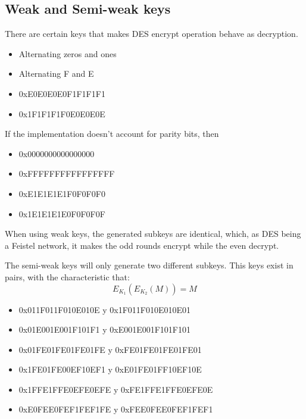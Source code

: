 \documentclass[titlepage, 12pt]{article}
\numberwithin{equation}{section}%
\numberwithin{figure}{section}%
\numberwithin{table}{section}%
\begin{document}
		\subsection{Weak and Semi-weak keys}
		There are certain keys that makes DES encrypt operation behave as decryption.
		\begin{itemize}
			\item Alternating zeros and ones
			\item Alternating F and E
			\item 0xE0E0E0E0F1F1F1F1
			\item 0x1F1F1F1F0E0E0E0E
		\end{itemize}
		If the implementation doesn't account for parity bits, then
		\begin{itemize}
			\item 0x0000000000000000
			\item 0xFFFFFFFFFFFFFFFF
			\item 0xE1E1E1E1F0F0F0F0
			\item 0x1E1E1E1E0F0F0F0F
		\end{itemize}
		When using weak keys, the generated subkeys are identical, which, as DES being a Feistel network, it makes the odd rounds encrypt while the even decrypt.
		
		The semi-weak keys will only generate two different subkeys. This keys exist in pairs, with the characteristic that:
		\begin{equation*}
		E_{K_1}(E_{K_2}(M))=M
		\end{equation*}
		\begin{itemize}
			\item 0x011F011F010E010E y 0x1F011F010E010E01
			\item 0x01E001E001F101F1 y 0xE001E001F101F101
			\item 0x01FE01FE01FE01FE y 0xFE01FE01FE01FE01
			\item 0x1FE01FE00EF10EF1 y 0xE01FE01FF10EF10E
			\item 0x1FFE1FFE0EFE0EFE y 0xFE1FFE1FFE0EFE0E
			\item 0xE0FEE0FEF1FEF1FE y 0xFEE0FEE0FEF1FEF1
		\end{itemize}
\end{document}

